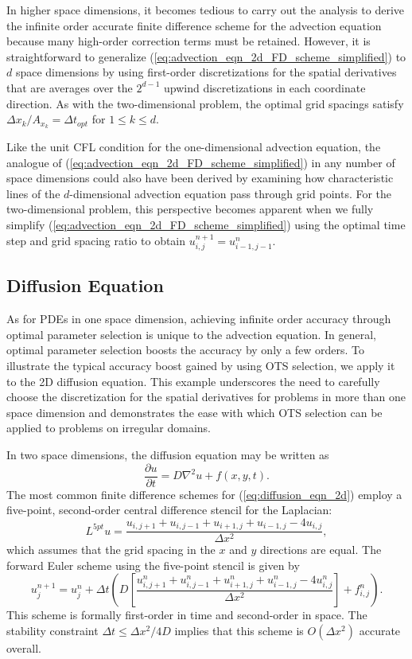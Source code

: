 \documentclass[fleqn,12pt,twoside]{article}
\newcommand{\beq}{\begin{equation}}
\newcommand{\eeq}{\end{equation}}
\def\pt{\partial t}
\def\dt{\Delta t}
\def\dx{\Delta x}
\begin{document}
In higher space dimensions, it becomes tedious to carry out the analysis 
to derive the infinite order accurate finite difference scheme for the 
advection equation because many high-order correction terms must be retained.  
However, it is straightforward to generalize 
(\ref{eq:advection_eqn_2d_FD_scheme_simplified}) to $d$ space dimensions by 
using first-order discretizations for the spatial derivatives that are 
averages over the $2^{d-1}$ upwind discretizations in each coordinate 
direction.   As with the two-dimensional problem, the optimal grid spacings 
satisfy $\dx_k/A_{x_k} = \dt_{opt}$ for $1 \le k \le d$.

Like the unit CFL condition for the one-dimensional advection equation, the 
analogue of (\ref{eq:advection_eqn_2d_FD_scheme_simplified}) in any number
of space dimensions could also have been derived by examining how 
characteristic lines of the $d$-dimensional advection equation pass 
through grid points.  For the two-dimensional problem, this perspective 
becomes apparent when we fully simplify 
(\ref{eq:advection_eqn_2d_FD_scheme_simplified}) using the 
optimal time step and grid spacing ratio to obtain
$u^{n+1}_{i,j} = u^{n}_{i-1,j-1}$.



\subsection{Diffusion Equation \label{sec:diffusion_eqn_2d}}
As for PDEs in one space dimension, achieving infinite order accuracy 
through optimal parameter selection is unique to the advection equation.
In general, optimal parameter selection boosts the accuracy by only a few 
orders.  To illustrate the typical accuracy boost gained by using OTS
selection, we apply it to the 2D diffusion equation.  This example underscores 
the need to carefully choose the discretization for the spatial derivatives 
for problems in more than one space dimension and demonstrates the ease with 
which OTS selection can be applied to problems on irregular domains.

In two space dimensions, the diffusion equation may be written as
\beq
  \frac{\partial u}{\pt} = D \nabla^2 u + f(x,y,t).
  \label{eq:diffusion_eqn_2d}
\eeq
The most common finite difference schemes for (\ref{eq:diffusion_eqn_2d}) 
employ a five-point, second-order central difference stencil for the 
Laplacian:
\beq
  L^{5pt} u = \frac{u_{i,j+1} + u_{i,j-1}
                   +u_{i+1,j} + u_{i-1,j} - 4u_{i,j}}{\dx^2},
  \label{eq:laplacian_2d_5pt_stencil}
\eeq
which assumes that the grid spacing in the $x$ and $y$ directions are
equal.  The forward Euler scheme using the five-point stencil is given by
\beq
  u^{n+1}_j = u^{n}_j 
  + \dt 
    \left( D \left[\frac{u^{n}_{i,j+1} + u^{n}_{i,j-1}
             +u^{n}_{i+1,j} + u^{n}_{i-1,j} - 4u^{n}_{i,j}}{\dx^2} \right]
         + f_{i,j}^n
    \right).
  \label{eq:diffusion_eqn_2d_5pt_scheme}
\eeq
This scheme is formally first-order in time and second-order in space.  
The stability constraint $\dt \le \dx^2/4D$ implies that this scheme is
$O(\dx^2)$ accurate overall.
\end{document}
